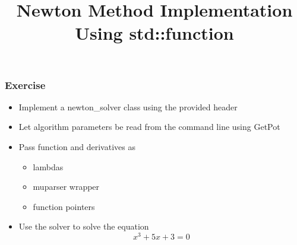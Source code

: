 \documentclass[smaller,a4paper,allowframebreaks]{beamer}
\begin{document}
\title{Newton Method Implementation Using std::function}
\frame{\titlepage}

\begin{frame}
\frametitle{Exercise}

\begin{itemize}
\item Implement a newton\_solver class using the provided 
header
\item Let algorithm parameters be read from the command line using GetPot
\item Pass function and derivatives as
\begin{itemize}
\item lambdas
\item muparser wrapper
\item function pointers
\end{itemize}
\item Use the solver to solve the equation
$$ x^{3} + 5 x + 3 = 0$$
\end{itemize}
\end{frame}
\end{document}

